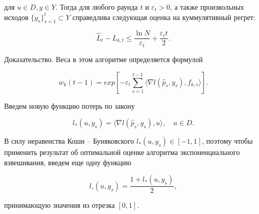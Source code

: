\documentclass{article}
\begin{document}
для $u \in D, y \in Y$. Тогда для любого раунда $t$ и $\varepsilon_t > 0$, а также произвольных исходов
$\{y_s\}^t_{s=1} \subset Y$ справедлива следующая оценка на куммулятивный регрет:

\[
\hat{L}_t - L_{k,t} \le \frac{\ln{N}}{\varepsilon_t} + \frac{\varepsilon_t t}{2}.
\]

Доказательство. Веса в этом алгоритме определяется формулой

\[
w_k(t-1) = exp[-\varepsilon_t \sum^{t-1}_{s=1} \langle \nabla l(\hat{p}_s, y_s), f_{k,s} \rangle].
\]

Введем новую функцию потерь по закону

\[
l_*(u, y_s) = \langle \nabla l(\hat{p}_s, y_s), u \rangle, \quad u \in D.
\]

В силу неравенства Коши – Буняковского $l_*(u, y_s) \in [-1, 1]$, поэтому чтобы применить
результат об оптимальной оценке алгоритма экспоненциального взвешивания, введем
еще одну функцию

\[
l_\circ (u, y_s) = \frac{1 + l_*(u, y_s)}{2},
\]

принимающую значения из отрезка $[0, 1]$.
\end{document}
